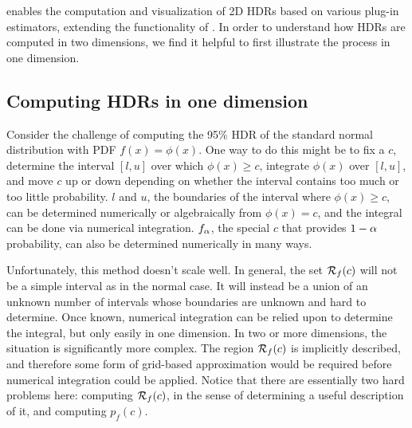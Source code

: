 



 enables the computation and visualization of 2D HDRs based on various plug-in estimators, extending the functionality of .
In order to understand how HDRs are computed in two dimensions, we find it helpful to first illustrate the process in one dimension.


\subsection{Computing HDRs in one dimension}\label{sec:hdr1d}

Consider the challenge of computing the 95\% HDR of the standard normal distribution with PDF $f(x) = \phi(x)$.
One way to do this might be to fix a $c$, determine the interval $[l,u]$ over which $\phi(x) \geq c$, integrate $\phi(x)$ over $[l,u]$, and move $c$ up or down depending on whether the interval contains too much or too little probability.
$l$ and $u$, the boundaries of the interval where $\phi(x) \geq c$, can be determined numerically or algebraically from $\phi(x) = c$, and the integral can be done via numerical integration.
$f_{\alpha}$, the special $c$ that provides $1 - \alpha$ probability, can also be determined numerically in many ways.

Unfortunately, this method doesn't scale well.
In general, the set $\mathcal{R}_{f}(c)$ will not be a simple interval as in the normal case.
It will instead be a union of an unknown number of intervals whose boundaries are unknown and hard to determine.
Once known, numerical integration can be relied upon to determine the integral, but only easily in one dimension.
In two or more dimensions, the situation is significantly more complex.
The region $\mathcal{R}_{f}(c)$ is implicitly described, and therefore some form of grid-based approximation would be required before numerical integration could be applied.
Notice that there are essentially two hard problems here: computing $\mathcal{R}_{f}(c)$, in the sense of determining a useful description of it, and computing $p_{f}(c)$.

